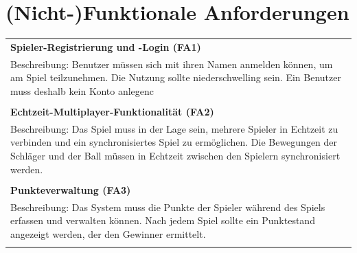 \documentclass[
]{article}
\begin{document}
\section{(Nicht-)Funktionale Anforderungen}
\begin{center}
  \begin{tabular}{|p{\linewidth}|}
    \hline
    \textbf{Spieler-Registrierung und -Login (FA1)} \\
    Beschreibung: Benutzer müssen sich mit ihren Namen anmelden können, um am Spiel teilzunehmen.
    Die Nutzung sollte niederschwelling sein. Ein Benutzer muss deshalb kein Konto anlegenc \\ \\
    \hline
    \textbf{Echtzeit-Multiplayer-Funktionalität (FA2)} \\
    Beschreibung: Das Spiel muss in der Lage sein, mehrere Spieler in Echtzeit zu verbinden und ein synchronisiertes Spiel zu ermöglichen. Die Bewegungen der Schläger und der Ball müssen in Echtzeit zwischen den Spielern synchronisiert werden.\\ \\
    \hline
    \textbf{Punkteverwaltung (FA3)} \\
    Beschreibung: Das System muss die Punkte der Spieler während des Spiels erfassen und verwalten können. Nach jedem Spiel sollte ein Punktestand angezeigt werden, der den Gewinner ermittelt. \\ \\
    \hline
  \end{tabular}
\end{center}
\end{document}

